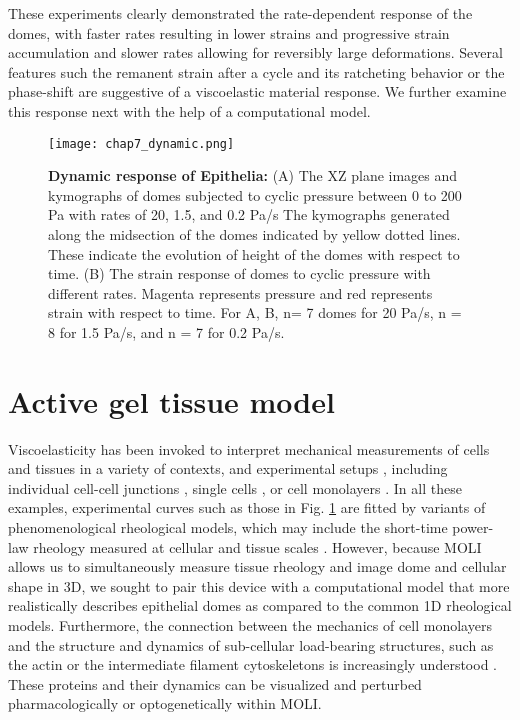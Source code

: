 These experiments clearly demonstrated the rate-dependent response of the domes, with faster rates resulting in lower strains and progressive strain accumulation and slower rates allowing for reversibly large deformations. Several features such the remanent strain after a cycle and its ratcheting behavior or the phase-shift are suggestive of a viscoelastic material response. We further examine this response next with the help of a computational model.




\begin{figure}[]
	\centering
	\texttt{[image: chap7\_dynamic.png]}
	\caption{\label{fig_7_6} \textbf{Dynamic response of Epithelia:} (A) The XZ plane images and kymographs of domes subjected to cyclic pressure between 0 to 200 Pa with rates of 20, 1.5, and 0.2 Pa/s The kymographs generated along the midsection of the domes indicated by yellow dotted lines. These indicate the evolution of height of the domes with respect to time. (B) The strain response of domes to cyclic pressure with different rates. Magenta represents pressure and red represents strain with respect to time. For A, B, n= 7 domes for 20 Pa/s, n = 8 for 1.5 Pa/s, and n = 7 for 0.2 Pa/s. 
	}
\end{figure}

\newpage

\hypertarget{active-gel-tissue-model}{%
	\section{Active gel tissue model}\label{active-gel-tissue-model}}


Viscoelasticity has been invoked to interpret mechanical measurements of cells and tissues in a variety of contexts, and experimental setups \cite{PULLARKAT200729}, including individual cell-cell junctions \cite{clement2017}, single cells \cite{PhysRevLett.94.098103,Fischer-Friedrich:2016aa}, or cell monolayers \cite{Fernandez_2007,khalilgharibi2019}. In all these examples, experimental curves such as those in Fig. \ref{fig_7_6} are fitted by variants of phenomenological rheological models, which may include the short-time power-law rheology measured at cellular and tissue scales   \cite{PULLARKAT200729,doi:10.1098/rsos.190920,khalilgharibi2019}. However, because MOLI allows us to simultaneously measure tissue rheology and image dome and cellular shape in 3D, we sought to pair this device with a computational model that more realistically describes epithelial domes as compared to the common 1D rheological models. Furthermore, the connection between the mechanics of cell monolayers and the structure and dynamics of sub-cellular load-bearing structures, such as the actin or the intermediate filament cytoskeletons is increasingly understood \cite{latorre2018,khalilgharibi2019,duque2023}. These proteins and their dynamics can be visualized and perturbed pharmacologically or optogenetically within MOLI.

